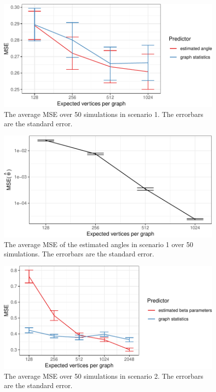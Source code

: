 \documentclass[12pt]{article}
\begin{document}
\begin{figure}[H]

{\centering \includegraphics{draft_files/figure-latex/angle-regression-sim-1} 

}

\caption{The average MSE over 50 simulations in scenario 1. The errorbars are the standard error.}\label{fig:angle-regression-sim}
\end{figure}

\begin{figure}[H]

{\centering \includegraphics{draft_files/figure-latex/theta-mse-1} 

}

\caption{The average MSE of the estimated angles in scenario 1 over 50 simulations. The errorbars are the standard error.}\label{fig:theta-mse}
\end{figure}

\begin{figure}[H]

{\centering \includegraphics{draft_files/figure-latex/beta-regression-sim-1} 

}

\caption{The average MSE over 50 simulations in scenario 2. The errorbars are the standard error.}\label{fig:beta-regression-sim}
\end{figure}
\end{document}
